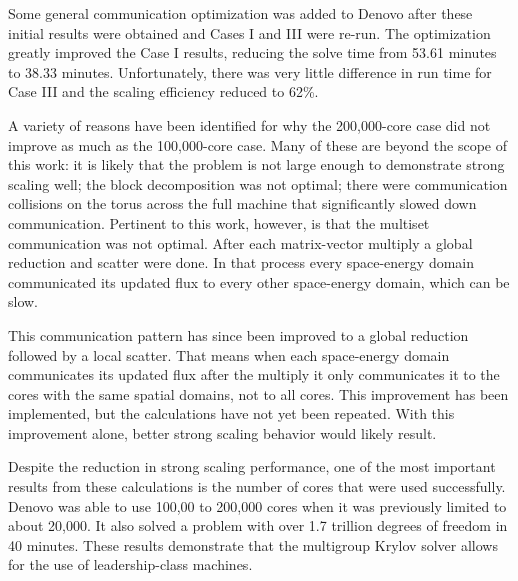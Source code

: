 Some general communication optimization was added to Denovo after these initial results were obtained and Cases I and III were re-run. The optimization greatly improved the Case I results, reducing the solve time from 53.61 minutes to 38.33 minutes. Unfortunately, there was very little difference in run time for Case III and the scaling efficiency reduced to 62\%. %

A variety of reasons have been identified for why the 200,000-core case did not improve as much as the 100,000-core case. Many of these are beyond the scope of this work: it is likely that the problem is not large enough to demonstrate strong scaling well; the block decomposition was not optimal; there were communication collisions on the torus across the full machine that significantly slowed down communication. Pertinent to this work, however, is that the multiset communication was not optimal. After each matrix-vector multiply a global reduction and scatter were done. In that process every space-energy domain communicated its updated flux to every other space-energy domain, which can be slow. 

This communication pattern has since been improved to a global reduction followed by a local scatter. That means when each space-energy domain communicates its updated flux after the multiply it only communicates it to the cores with the same spatial domains, not to all cores. This improvement has been implemented, but the calculations have not yet been repeated. With this improvement alone, better strong scaling behavior would likely result. 

Despite the reduction in strong scaling performance, one of the most important results from these calculations is the number of cores that were used successfully. Denovo was able to use 100,00 to 200,000 cores when it was previously limited to about 20,000. It also solved a problem with over 1.7 trillion degrees of freedom in 40 minutes. These results demonstrate that the multigroup Krylov solver allows for the use of leadership-class machines.

